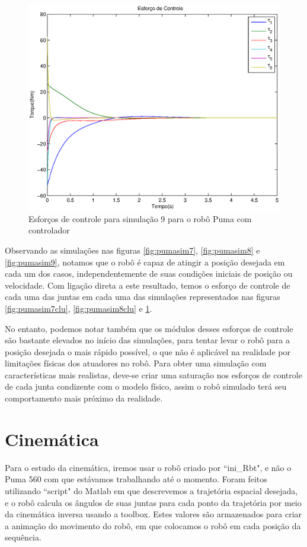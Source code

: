 \documentclass{article}
\begin{document}
\begin{figure}[H]
	\centering
	\includegraphics[width=0.8\linewidth]{../sim3clu}
	\caption{Esforços de controle para simulação 9 para o robô Puma com controlador}
	\label{fig:pumasim9clu}
\end{figure}

Observando as simulações nas figuras \ref{fig:pumasim7}, \ref{fig:pumasim8} e \ref{fig:pumasim9}, notamos que o robô é capaz de atingir a posição desejada em cada um dos casos, independentemente de suas condições iniciais de posição ou velocidade. Com ligação direta a este resultado, temos o esforço de controle de cada uma das juntas em cada uma das simulações representados nas figuras \ref{fig:pumasim7clu}, \ref{fig:pumasim8clu} e \ref{fig:pumasim9clu}.

No entanto, podemos notar também que os módulos desses esforços de controle são bastante elevados no início das simulações, para tentar levar o robô para a posição desejada o mais rápido possível, o que não é aplicável na realidade por limitações físicas dos atuadores no robô. Para obter uma simulação com características mais realistas, deve-se criar uma saturação nos esforços de controle de cada junta condizente com o modelo físico, assim o robô simulado terá seu comportamento mais próximo da realidade.

\section{Cinemática}
Para o estudo da cinemática, iremos usar o robô criado por ``ini\_Rbt"\cite{bb:inirbt}, e não o Puma 560 com que estávamos trabalhando até o momento. Foram feitos utilizando ``script" do Matlab em que descrevemos a trajetória espacial desejada, e o robô calcula os ângulos de suas juntas para cada ponto da trajetória por meio da cinemática inversa usando a toolbox\cite{bb:toolbox}. Estes valores são armazenados para criar a animação do movimento do robô, em que colocamos o robô em cada posição da sequência.
\end{document}
